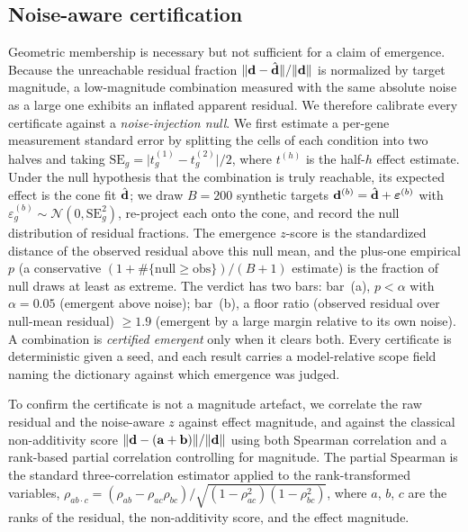 \subsection{Noise-aware certification}
\label{sec:methods-null}
Geometric membership is necessary but not sufficient for a claim of emergence. Because the
unreachable residual fraction $\lVert\mathbf{d}-\hat{\mathbf{d}}\rVert/\lVert\mathbf{d}\rVert$ is normalized by
target magnitude, a low-magnitude combination measured with the same absolute noise as a large one
exhibits an inflated apparent residual. We therefore calibrate every certificate against a
\emph{noise-injection null}. We first estimate a per-gene measurement standard error by splitting
the cells of each condition into two halves and taking $\mathrm{SE}_g=\lvert t^{(1)}_g-t^{(2)}_g\rvert/2$,
where $t^{(h)}$ is the half-$h$ effect estimate. Under the null hypothesis that the combination is
truly reachable, its expected effect is the cone fit $\hat{\mathbf{d}}$; we draw $B=200$ synthetic
targets $\mathbf{d}^{(b)}=\hat{\mathbf{d}}+\bm{\varepsilon}^{(b)}$ with $\varepsilon^{(b)}_g\sim\mathcal{N}(0,\mathrm{SE}_g^2)$,
re-project each onto the cone, and record the null distribution of residual fractions. The emergence
$z$-score is the standardized distance of the observed residual above this null mean, and the
plus-one empirical $p$ (a conservative $(1+\#\{\text{null}\ge\text{obs}\})/(B+1)$ estimate) is the fraction of null draws at least as extreme.
The verdict has two bars: bar~(a), $p<\alpha$ with $\alpha=0.05$ (emergent above noise); bar~(b), a
floor ratio (observed residual over null-mean residual) $\ge 1.9$ (emergent by a large margin
relative to its own noise). A combination is \emph{certified emergent} only when it clears both.
Every certificate is deterministic given a seed, and each result carries a model-relative scope
field naming the dictionary against which emergence was judged.

To confirm the certificate is not a magnitude artefact, we correlate the raw residual and the
noise-aware $z$ against effect magnitude, and against the classical non-additivity score
$\lVert\mathbf{d}-(\mathbf{a}+\mathbf{b})\rVert/\lVert\mathbf{d}\rVert$ using both Spearman correlation and a
rank-based partial correlation controlling for magnitude. The partial Spearman is the standard
three-correlation estimator applied to the rank-transformed variables,
$\rho_{ab\cdot c}=(\rho_{ab}-\rho_{ac}\rho_{bc})/\sqrt{(1-\rho_{ac}^2)(1-\rho_{bc}^2)}$, where $a$,
$b$, $c$ are the ranks of the residual, the non-additivity score, and the effect magnitude.

